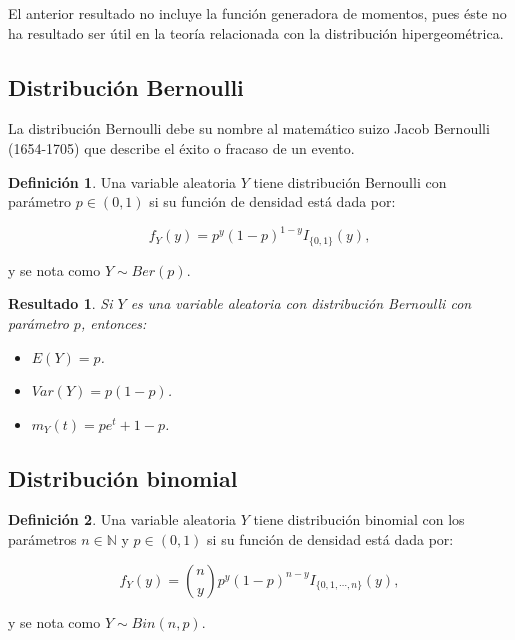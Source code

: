\documentclass[
  12pt,
  spanish,
]{book}
\providecommand{\tightlist}{%
  \setlength{\itemsep}{0pt}\setlength{\parskip}{0pt}}
\newtheorem{proposition}{Resultado}[chapter]
\theoremstyle{definition}
\newtheorem{definition}{Definición}[chapter]
\theoremstyle{definition}
\theoremstyle{definition}
\theoremstyle{definition}
\theoremstyle{remark}
\begin{document}
El anterior resultado no incluye la función generadora de momentos, pues éste no ha resultado ser útil en la teoría relacionada con la distribución hipergeométrica.

\hypertarget{distribuciuxf3n-bernoulli}{%
\subsection{Distribución Bernoulli}\label{distribuciuxf3n-bernoulli}}

La distribución Bernoulli debe su nombre al matemático suizo Jacob Bernoulli (1654-1705) que describe el éxito o fracaso de un evento.

\begin{definition}
\protect\hypertarget{def:unnamed-chunk-5}{}{\label{def:unnamed-chunk-5} }Una variable aleatoria \(Y\) tiene distribución Bernoulli con parámetro \(p\in (0,1)\) si su función de densidad está dada por:

\begin{equation}
f_Y(y)=p^y(1-p)^{1-y}I_{\{0,1\}}(y),
\end{equation}

y se nota como \(Y\sim Ber(p)\).
\end{definition}

\begin{proposition}
\protect\hypertarget{prp:unnamed-chunk-6}{}{\label{prp:unnamed-chunk-6} }Si \(Y\) es una variable aleatoria con distribución Bernoulli con parámetro \(p\), entonces:

\begin{itemize}
\tightlist
\item
  \(E(Y)=p\).
\item
  \(Var(Y)=p(1-p)\).
\item
  \(m_Y(t)=pe^t+1-p\).
\end{itemize}
\end{proposition}

\hypertarget{distribuciuxf3n-binomial}{%
\subsection{Distribución binomial}\label{distribuciuxf3n-binomial}}

\begin{definition}
\protect\hypertarget{def:unnamed-chunk-7}{}{\label{def:unnamed-chunk-7} }Una variable aleatoria \(Y\) tiene distribución binomial con los parámetros \(n\in \mathbb{N}\) y \(p\in (0,1)\) si su función de densidad está dada por:

\begin{equation}
f_Y(y)=\binom{n}{y}p^y(1-p)^{n-y}I_{\{0,1,\cdots,n\}}(y),
\end{equation}

y se nota como \(Y\sim Bin(n,p)\).
\end{definition}
\end{document}
